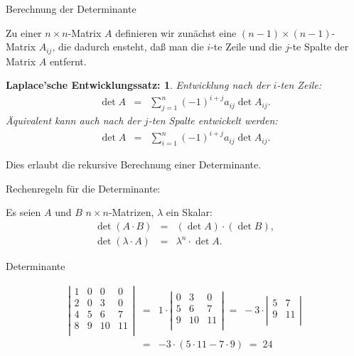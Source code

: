 \documentclass[german]{beamer}
\newcommand{\bq}{\begin{eqnarray*}}
\newcommand{\eq}{\end{eqnarray*}}
\newtheorem*{mytheorem17}{Laplace'sche Entwicklungssatz:}
\begin{document}
\begin{frame}{Berechnung der Determinante}

Zu einer $n\times n$-Matrix $A$ definieren wir zun\"achst eine $(n-1)\times (n-1)$-Matrix $A_{ij}$, 
die dadurch ensteht, da{\ss} man die $i$-te Zeile und die $j$-te Spalte der Matrix $A$ entfernt.

\begin{mytheorem17}
Entwicklung nach der $i$-ten Zeile:
{\small
\bq
 \det A & = & \sum\limits_{j=1}^n (-1)^{i+j} a_{ij} \det A_{ij}.
\eq
}
\"Aquivalent kann auch nach der $j$-ten Spalte entwickelt werden:
{\small
\bq
 \det A & = & \sum\limits_{i=1}^n (-1)^{i+j} a_{ij} \det A_{ij}.
\eq
}
\end{mytheorem17}

Dies erlaubt die rekursive Berechnung einer Determinante. 

\end{frame}

\begin{frame}{Rechenregeln f\"ur die Determinante:}

Es seien $A$ und $B$ $n\times n$-Matrizen, $\lambda$ ein Skalar:
\bq
 \det \left( A \cdot B \right) & = & \left( \det A \right) \cdot \left( \det B \right),
 \nonumber \\
 \det \left( \lambda \cdot A \right) & = & \lambda ^n \cdot \det A.
\eq

\end{frame}

\begin{frame}{Determinante}

\begin{example}
\bq
\left| \begin{array}{cccc}
 1 & 0 & 0 & 0 \\
 2 & 0 & 3 & 0 \\
 4 & 5 & 6 & 7 \\
 8 & 9 & 10 & 11 \\
\end{array} \right|
 & = &
 1 \cdot
\left| \begin{array}{ccc}
 0 & 3 & 0 \\
 5 & 6 & 7 \\
 9 & 10 & 11 \\
\end{array} \right|
 \; = \;
 -3 \cdot
\left| \begin{array}{cc}
 5 & 7 \\
 9 & 11 \\
\end{array} \right|
 \nonumber \\
 & = & 
 -3 \cdot \left( 5 \cdot 11 - 7 \cdot 9 \right)
 \; = \;
 24 
\eq
\end{example}

\end{frame}
\end{document}
